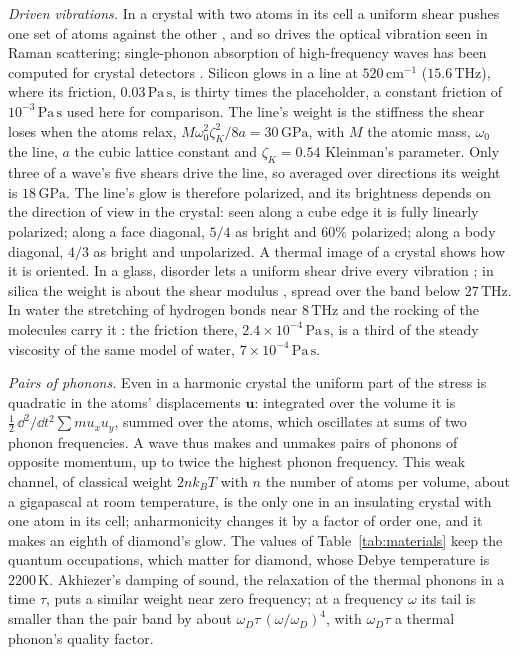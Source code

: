 \emph{Driven vibrations.} In a crystal with two atoms in its cell a uniform
shear pushes one set of atoms against the other \cite{Tanner2021}, and so drives
the optical vibration seen in Raman scattering; single-phonon absorption of
high-frequency waves has been computed for crystal detectors
\cite{KahnSchutteEngelTrickle2024}. Silicon glows in a line at
$520\,\mathrm{cm^{-1}}$ ($15.6\,\mathrm{THz}$), where its friction,
$0.03\,\mathrm{Pa\,s}$, is thirty times the placeholder, a constant friction
of $10^{-3}\,\mathrm{Pa\,s}$ used here for comparison. The line's weight is the
stiffness the shear loses when the atoms relax, $M\omega_0^2\zeta_K^2/8a =
30\,\mathrm{GPa}$, with $M$ the atomic mass, $\omega_0$ the line, $a$ the cubic
lattice constant and $\zeta_K = 0.54$ Kleinman's parameter. Only three of a
wave's five shears drive the line, so averaged over directions its weight is
$18\,\mathrm{GPa}$. The line's glow is therefore polarized, and its brightness
depends on the direction of view in the crystal: seen along a cube edge it is
fully linearly polarized; along a face diagonal, $5/4$ as bright and $60\%$
polarized; along a body diagonal, $4/3$ as bright and unpolarized. A thermal
image of a crystal shows how it is oriented. In a glass, disorder lets a
uniform shear drive every vibration \cite{LemaitreMaloney2006,Damart2017}; in
silica the weight is about the shear modulus \cite{Leonforte2006}, spread over
the band below $27\,\mathrm{THz}$. In water the stretching of hydrogen bonds near
$8\,\mathrm{THz}$ and the rocking of the molecules carry it \cite{Schulz2020}:
the friction there, $2.4\times10^{-4}\,\mathrm{Pa\,s}$, is a third of the steady
viscosity of the same model of water, $7\times10^{-4}\,\mathrm{Pa\,s}$.

\emph{Pairs of phonons.} Even in a harmonic crystal the uniform part of the
stress is quadratic in the atoms' displacements $\mathbf u$: integrated over the
volume it is $\tfrac12\,\dd^2/\dd t^2 \sum m u_x u_y$, summed over the atoms,
which oscillates at sums of two phonon frequencies. A wave thus makes and
unmakes pairs of phonons of opposite momentum, up to twice the highest phonon
frequency. This weak channel, of classical weight $2nk_BT$ with $n$ the number of
atoms per volume, about a gigapascal at room temperature, is the only one in an
insulating crystal with one atom in its cell; anharmonicity changes it by a
factor of order one, and it makes an eighth of diamond's glow. The values of
Table~\ref{tab:materials} keep the quantum occupations, which matter for
diamond, whose Debye temperature is $2200\,\mathrm{K}$. Akhiezer's
damping of sound, the relaxation of the thermal phonons in a time $\tau$, puts a
similar weight near zero frequency; at a frequency $\omega$ its tail is
smaller than the pair band by about $\omega_D\tau\,(\omega/\omega_D)^4$, with
$\omega_D\tau$ a thermal phonon's quality factor.


